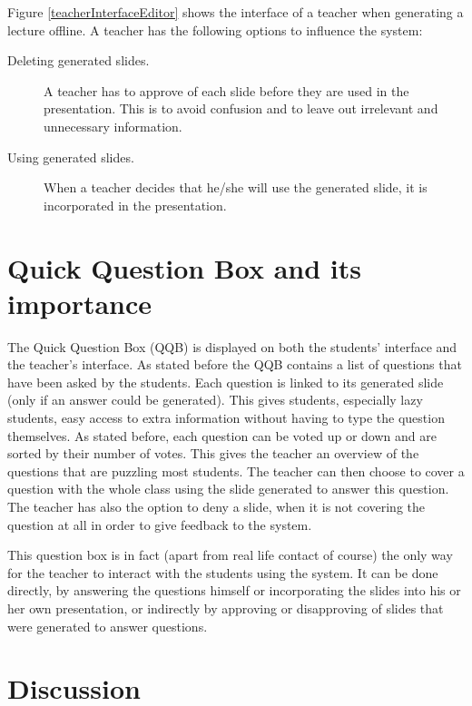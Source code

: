 \documentclass[11pt]{article}
\begin{document}
Figure \ref{teacherInterfaceEditor} shows the interface of a teacher when generating a lecture offline. A teacher has the following options to influence the system: 
\begin{description}
\item[Deleting generated slides.] A teacher has to approve of each slide before they are used in the presentation. This is to avoid confusion and to leave out irrelevant and unnecessary information.
\item[Using generated slides.] When a teacher decides that he/she will use the generated slide, it is incorporated in the presentation. 
\end{description}

\section{Quick Question Box and its importance}
The Quick Question Box (QQB) is displayed on both the students' interface and the teacher's interface. As stated before the QQB contains a list of questions that have been asked by the students. Each question is linked to its generated slide (only if an answer could be generated). This gives students, especially lazy students, easy access to extra information without having to type the question themselves. As stated before, each question can be voted up or down and are sorted by their number of votes. This gives the teacher an overview of the questions that are puzzling most students. The teacher can then choose to cover a question with the whole class using the slide generated to answer this question. The teacher has also the option to deny a slide, when it is not covering the question at all in order to give feedback to the system. 

This question box is in fact (apart from real life contact of course) the only way for the teacher to interact with the students using the system. It can be done directly, by answering the questions himself or incorporating the slides into his or her own presentation, or indirectly by approving or disapproving of slides that were generated to answer questions. 



\section{Discussion}
\end{document}
